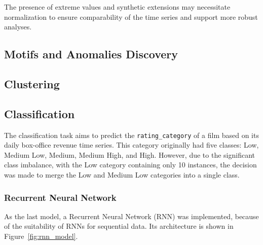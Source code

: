 The presence of extreme values and synthetic extensions may necessitate normalization to ensure comparability 
of the time series and support more robust analyses.



\subsection{Motifs and Anomalies Discovery}



\subsection{Clustering}

\subsection{Classification}

The classification task aims to predict the \texttt{rating\_category} of a film based on its daily box-office revenue time series.
This category originally had five classes: Low, Medium Low, Medium, Medium High, and High.
However, due to the significant class imbalance, with the Low category containing only 10 instances,
the decision was made to merge the Low and Medium Low categories into a single class.


\subsubsection{Recurrent Neural Network}

As the last model, a Recurrent Neural Network (RNN) was
implemented, because of the suitability of RNNs for
sequential data.
Its architecture is shown in Figure~\ref{fig:rnn_model}.


